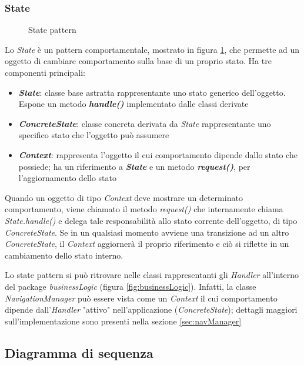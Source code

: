 \documentclass{article}
\begin{document}
  \subsubsection{State}
  \label{sec:statePattern}

  \begin{figure}[H]
    \centering
    
    \caption{State pattern}
    \label{fig:statePattern}
  \end{figure}

  Lo \textit{State} è un pattern comportamentale, mostrato in figura \ref{fig:statePattern}, che permette ad un oggetto di cambiare comportamento sulla base di un proprio stato. Ha tre componenti principali:
  \begin{itemize}
    \item \textbf{\textit{State}}: classe base astratta rappresentante uno stato generico dell'oggetto. Espone un metodo \textbf{\textit{handle()}} implementato dalle classi derivate
    \item \textbf{\textit{ConcreteState}}: classe concreta derivata da \textit{State} rappresentante uno specifico stato che l'oggetto può assumere
    \item \textbf{\textit{Context}}: rappresenta l'oggetto il cui comportamento dipende dallo stato che possiede; ha un riferimento a \textbf{\textit{State}} e un metodo \textbf{\textit{request()}}, per l'aggiornamento dello stato
  \end{itemize}

  Quando un oggetto di tipo \textit{Context} deve mostrare un determinato comportamento, viene chiamato il metodo \textit{request()} che internamente chiama \textit{State.handle()} e delega tale responsabilità allo stato corrente dell'oggetto, di tipo \textit{ConcreteState}. Se in un qualsiasi momento avviene una transizione ad un altro \textit{ConcreteState}, il \textit{Context} aggiornerà il proprio riferimento e ciò si riflette in un cambiamento dello stato interno.

  Lo state pattern si può ritrovare nelle classi rappresentanti gli \textit{Handler} all'interno del package \textit{businessLogic} (figura \ref{fig:businessLogic}). Infatti, la classe \textit{NavigationManager} può essere vista come un \textit{Context} il cui comportamento dipende dall'\textit{Handler} "attivo" nell'applicazione (\textit{ConcreteState}); dettagli maggiori sull'implementazione sono presenti nella sezione \ref{sec:navManager}

  \subsection{Diagramma di sequenza}
\end{document}
